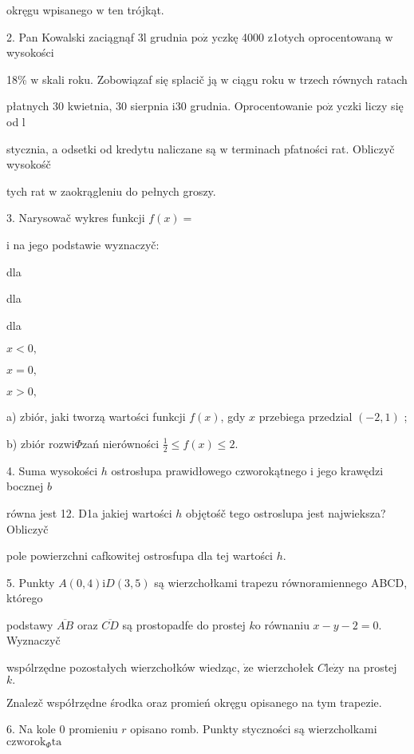 \documentclass[a4paper,12pt]{article}
\begin{document}
okręgu wpisanego $\mathrm{w}$ ten trójkąt.

2. Pan Kowalski zaciągnąf 3l grudnia $\mathrm{p}\mathrm{o}\dot{\mathrm{z}}$ yczkę 4000 z1otych oprocentowaną $\mathrm{w}$ wysokości

18\% $\mathrm{w}$ skali roku. Zobowiązaf się splacič ją $\mathrm{w}$ ciągu roku $\mathrm{w}$ trzech równych ratach

płatnych 30 kwietnia, 30 sierpnia $\mathrm{i}30$ grudnia. Oprocentowanie $\mathrm{p}\mathrm{o}\dot{\mathrm{z}}$ yczki liczy się od l

stycznia, a odsetki od kredytu naliczane są $\mathrm{w}$ terminach pfatności rat. Obliczyč wysokośč

tych rat $\mathrm{w}$ zaokrągleniu do pełnych groszy.

3. Narysowač wykres funkcji $f(x)=$

$\mathrm{i}$ na jego podstawie wyznaczyč:

dla

dla

dla

$x<0,$

$x=0,$

$x>0,$

a) zbiór, jaki tworzą wartości funkcji $f(x)$, gdy $x$ przebiega przedzial $(-2,1)$ ;

b) zbiór rozwi$\Phi$zań nierówności $\displaystyle \frac{1}{2}\leq f(x)\leq 2.$

4. Suma wysokości $h$ ostrosłupa prawidłowego czworokątnego $\mathrm{i}$ jego krawędzi bocznej $b$

równa jest 12. D1a jakiej wartości $h$ objętośč tego ostroslupa jest najwieksza? Obliczyč

pole powierzchni cafkowitej ostrosfupa dla tej wartości $h.$

5. Punkty $A(0,4) \mathrm{i}D(3,5)$ są wierzchołkami trapezu równoramiennego ABCD, którego

podstawy $\overline{AB}$ oraz $\overline{CD}$ są prostopadfe do prostej $k\mathrm{o}$ równaniu $x-y-2=0$. Wyznaczyč

wspólrzędne pozostałych wierzchołków wiedząc, $\dot{\mathrm{z}}\mathrm{e}$ wierzchołek $C \mathrm{l}\mathrm{e}\dot{\mathrm{z}}\mathrm{y}$ na prostej $k.$

Znalez$\acute{}$č współrzędne środka oraz promień okręgu opisanego na tym trapezie.

6. Na kole $0$ promieniu $r$ opisano romb. Punkty styczności są wierzcholkami $\mathrm{c}\mathrm{z}\mathrm{w}\mathrm{o}\mathrm{r}\mathrm{o}\mathrm{k}_{\Phi}\mathrm{t}\mathrm{a}$
\end{document}
